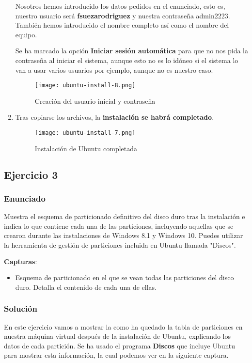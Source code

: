 \begin{enumerate}
    Nosotros hemos introducido los datos pedidos en el enunciado, esto es, nuestro usuario será \textbf{fsuezarodriguez} y nuestra contraseña {admin2223}. También hemos introducido el nombre completo así como el nombre del equipo.

    Se ha marcado la opción \textbf{Iniciar sesión automática} para que no nos pida la contraseña al iniciar el sistema, aunque esto no es lo idóneo si el sistema lo van a usar varios usuarios por ejemplo, aunque no es nuestro caso.

    \begin{figure}[H]
        \centering
        \texttt{[image: ubuntu-install-8.png]}
        \caption{Creación del usuario inicial y contraseña}
    \end{figure}

    \item Tras copiarse los archivos, la \textbf{instalación se habrá completado}.

    \begin{figure}[H]
        \centering
        \texttt{[image: ubuntu-install-7.png]}
        \caption{Instalación de Ubuntu completada}
    \end{figure}
\end{enumerate}

\subsection{Ejercicio 3}

\subsubsection{Enunciado}
Muestra el esquema de particionado definitivo del disco duro tras la instalación e indica lo que contiene cada una de las particiones, incluyendo aquellas que se crearon durante las instalaciones de Windows 8.1 y Windows 10. Puedes utilizar la herramienta de gestión de particiones incluida en Ubuntu llamada "Discos".

\textbf{Capturas}:
\begin{itemize}
    \item Esquema de particionado en el que se vean todas las particiones del disco duro. Detalla el contenido de cada una de ellas.
\end{itemize}

\subsubsection{Solución}
En este ejercicio vamos a mostrar la como ha quedado la tabla de particiones en nuestra máquina virtual después de la instalación de Ubuntu, explicando los datos de cada partición. Se ha usado el programa \textbf{Discos} que incluye Ubuntu para mostrar esta información, la cual podemos ver en la siguiente captura.

